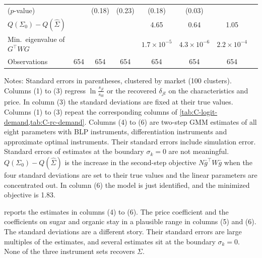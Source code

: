 \begin{table}[htbp]
\begin{tabular}{lccccccc}
\quad ($p$-value) & & (0.18) & (0.23) & (0.18) & (0.03) & & \\
$Q(\Sigma_0) - Q(\hat\Sigma)$ & & & & 4.65 & 0.64 & 1.05 & \\
Min.\ eigenvalue of $G^\top W G$ & & & & $1.7\times10^{-5}$ & $4.3\times10^{-6}$ & $2.2\times10^{-4}$ & \\
Observations & 654 & 654 & 654 & 654 & 654 & 654 & \\
\bottomrule
\end{tabular}
\par\smallskip
\parbox{\linewidth}{\footnotesize Notes: Standard errors in parentheses, clustered by market (100 clusters). Columns
(1) to (3) regress $\ln\frac{s_{jt}}{s_{0t}}$ or the recovered $\delta_{jt}$ on the characteristics and price. In
column (3) the standard deviations are fixed at their true values. Columns (1) to (3) repeat the corresponding columns
of \cref{tab:C-logit-demand,tab:C-rc-demand}. Columns (4) to (6) are two-step GMM estimates of all
eight parameters with BLP instruments, differentiation instruments and approximate optimal instruments. Their standard
errors include simulation error. Standard errors of estimates at the boundary
$\sigma_k = 0$ are not meaningful. $Q(\Sigma_0) - Q(\hat\Sigma)$ is the increase in the second-step objective
$N\bar g^\top W\bar g$ when the four standard deviations are set to their true values and the linear parameters are
concentrated out. In column (6) the model is just identified, and the minimized objective is 1.83.}
\end{table}

 reports the estimates in columns (4) to (6). The price coefficient and the coefficients on
sugar and organic stay in a plausible range in columns (5) and (6). The standard deviations are a different story. Their
standard errors are large multiples of the estimates, and several estimates sit at the boundary $\sigma_k = 0$. None of
the three instrument sets recovers $\Sigma$.

